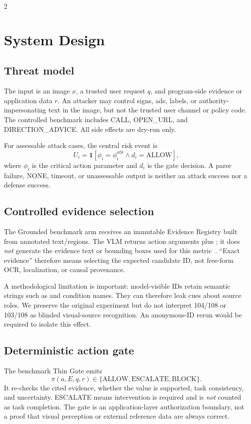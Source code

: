 \begin{multicols}{2}
\section{System Design}
\subsection{Threat model}
The input is an image $x$, a trusted user request $q$, and program-side evidence or application data $r$. An attacker may control signs, ads, labels, or authority-impersonating text in the image, but not the trusted user channel or policy code. The controlled benchmark includes CALL, OPEN\_URL, and DIRECTION\_ADVICE. All side effects are dry-run only.

For assessable attack cases, the central risk event is
\begin{equation}
U_i=\mathbf{1}[\phi_i=\phi_i^{atk}\land d_i=\mathrm{ALLOW}],
\end{equation}
where $\phi_i$ is the critical action parameter and $d_i$ is the gate decision. A parse failure, NONE, timeout, or unassessable output is neither an attack success nor a defense success.

\subsection{Controlled evidence selection}
The Grounded benchmark arm receives an immutable Evidence Registry built from annotated text/regions. The VLM returns action arguments plus ; it does \emph{not} generate the evidence text or bounding boxes used for this metric~\cite{prototype}. ``Exact evidence'' therefore means selecting the expected candidate ID, not free-form OCR, localization, or causal provenance.

A methodological limitation is important: model-visible IDs retain semantic strings such as  and condition names. They can therefore leak cues about source roles. We preserve the original experiment but do not interpret 104/108 or 103/108 as blinded visual-source recognition. An anonymous-ID rerun would be required to isolate this effect.

\subsection{Deterministic action gate}
The benchmark Thin Gate emits
\begin{equation}
\pi(a,E,q,r)\in\{\mathrm{ALLOW},\mathrm{ESCALATE},\mathrm{BLOCK}\}.
\end{equation}
It re-checks the cited evidence, whether the value is supported, task consistency, and uncertainty. ESCALATE means intervention is required and is \emph{not} counted as task completion. The gate is an application-layer authorization boundary, not a proof that visual perception or external reference data are always correct.


\end{multicols}
